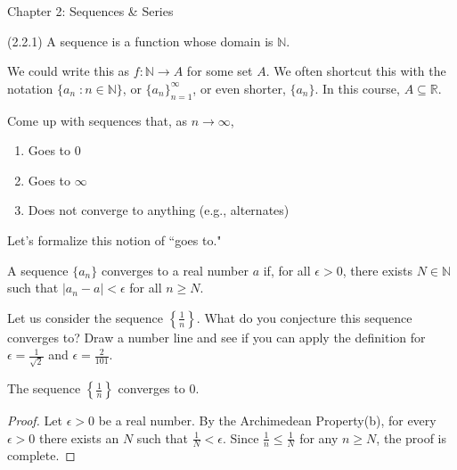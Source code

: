 \documentclass{ximera}
\begin{document}
\newpage

Chapter 2: Sequences \& Series

\begin{definition}{(2.2.1)}
    A sequence is a function whose domain is $\mathbb{N}$.
\end{definition}

We could write this as $f : \mathbb{N} \to A$ for some set $A$.  We often shortcut this with the notation $\{a_n \; : n \in \mathbb{N}\}$, or $\{a_n\}_{n=1}^\infty$, or even shorter, $\{a_n\}$.  In this course, $A \subseteq \mathbb{R}$.

\begin{exercise}
    Come up with sequences that, as $n \to \infty$,
    \begin{enumerate}
        \item Goes to $0$
        \item Goes to $\infty$
        \item Does not converge to anything (e.g., alternates)
    \end{enumerate}
\end{exercise}

Let's formalize this notion of ``goes to."

\begin{definition}
    A sequence $\{a_n\}$ converges to a real number $a$ if, for all $\epsilon > 0$, there exists $N \in \mathbb{N}$ such that $|a_n - a| < \epsilon$ for all $n \geq N$.
\end{definition}

\begin{exercise}
Let us consider the sequence $\left\{\frac{1}n\right\}$. What do you conjecture this sequence converges to?  Draw a number line and see if you can apply the definition for $\epsilon =\frac{1}{\sqrt2}$ and $\epsilon = \frac{2}{101}$.
\end{exercise}


\begin{theorem}
    The sequence $\left\{\frac1n\right\}$ converges to $0$.
\end{theorem}
\begin{proof}
    Let $\epsilon > 0$ be a real number.  By the Archimedean Property(b), for every $\epsilon > 0$ there exists an $N$ such that $\frac{1}N < \epsilon$.  Since $\frac{1}{n} \leq \frac{1}N$ for any $n \geq N$, the proof is complete.
\end{proof}
\end{document}
